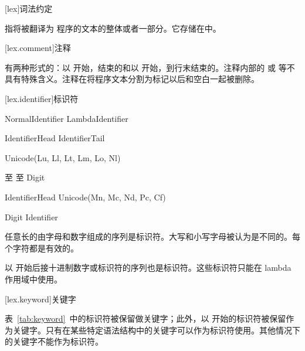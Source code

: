 
[lex]{词法约定}

\pnum
{}指将被翻译为 \X 程序的文本的整体或者一部分。它存储在中。

[lex.comment]{注释}

\pnum
有两种形式的：以\tcode{/*} 开始，\tcode{*/}结束的和以\tcode{//} 开始，到行末结束的。注释内部的 \tcode{/*} 或 \tcode{//} 等不具有特殊含义。注释在将程序文本分割为标记以后和空白一起被删除。

[lex.identifier]{标识符}

\begin{bnf}
 \br
    NormalIdentifier \br
    LambdaIdentifier
\end{bnf}

\begin{bnf}
 \br
    IdentifierHead IdentifierTail\bnfs
\end{bnf}

\begin{bnf}
 \br
    Unicode(Lu, Ll, Lt, Lm, Lo, Nl) \br
    \terminal{_}
\end{bnf}

\begin{bnf}
 \br
     \textnormal{至}  \br
     \textnormal{至}  \br
    Digit
\end{bnf}

\begin{bnf}
 \br
    IdentifierHead \br
    Unicode(Mn, Mc, Nd, Pc, Cf)
\end{bnf}

\begin{bnf}
 \br
    \terminal{\$} Digit\bnfp \br
    \terminal{\$} Identifier
\end{bnf}

\pnum
任意长的由字母和数字组成的序列是标识符。大写和小写字母被认为是不同的。每个字符都是有效的。

\pnum
以 \tcode{\$} 开始后接十进制数字或标识符的序列也是标识符。这些标识符只能在 lambda 作用域中使用。

[lex.keyword]{关键字}

\pnum
表~\ref{tab:keyword}~中的标识符被保留做关键字；此外，以 \tcode{\_\_} 开始的标识符被保留作为关键字。只有在某些特定语法结构中的关键字可以作为标识符使用。其他情况下的关键字不能作为标识符。

